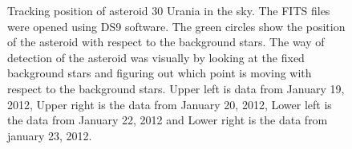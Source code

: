 \documentclass[letterpaper,12pt]{article}
\begin{document}
\begin{figure}[h!]
                                                                                                                                                                                                                                                                                                                                                                                                                                                                                                                                                                                                                                                                                                                                                                                                                                                                                                                                                                                \caption{Tracking position of asteroid 30 Urania in the sky. The FITS files were opened using DS9 software. The green circles show the position of the asteroid with respect to the background stars. The way of detection of the asteroid was visually by looking at the fixed background stars and figuring out which point is moving with respect to the background stars. Upper left is data from January 19, 2012, Upper right is the data from January 20, 2012, Lower left is the data from January 22, 2012 and Lower right is the data from january 23, 2012.}

\end{figure}
\end{document}
